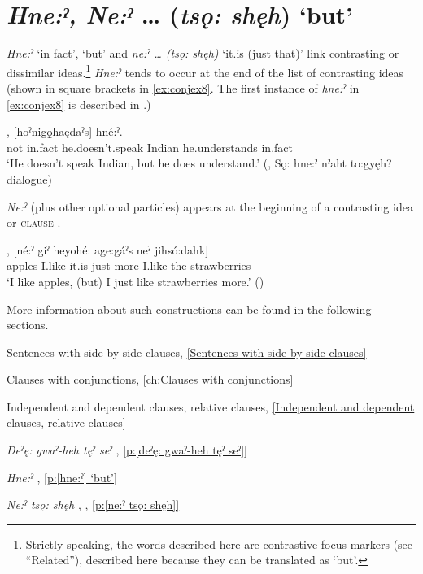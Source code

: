 \section{\textit{Hne:ˀ, Ne:ˀ} … (\textit{tsǫ: shęh}) ‘but’} \label{ch:[hne:ˀ], [ne:ˀ … (tsǫ: shęh)] ‘but’}
\textit{Hne:ˀ} ‘in fact’, ‘but’ and \textit{ne:ˀ … (tsǫ: shęh)} ‘it.is (just that)’ link contrasting or dissimilar ideas.\footnote{Strictly speaking, the words described here are contrastive focus markers (see “Related”), described here because they can be translated as ‘but’.} \textit{Hne:ˀ} tends to occur at the end of the list of contrasting ideas (shown in square brackets in \ref{ex:conjex8}. The first instance of \textit{hne:ˀ} in \ref{ex:conjex8} is described in .)

\ea\label{ex:conjex8}
, [hoˀnigǫ̱haędaˀs] hné:ˀ.\\
not in.fact he.doesn’t.speak Indian he.understands in.fact\\
\glt ‘He doesn’t speak Indian, but he does understand.’ (\cite[61]{mithun_watewayestanih_1984}, Sǫ: hne:ˀ nˀaht to:gyęh? dialogue)
\z

\textit{Ne:ˀ} (plus other optional particles) appears at the beginning of a contrasting idea or \textsc{clause} . 

\ea\label{ex:conjex13} 
, [né:ˀ giˀ heyohé: age:gáˀs neˀ jihsó:dahk]\\
apples I.like it.is just more I.like the strawberries\\
\glt ‘I like apples, (but) I just like strawberries more.’ (\cite[45]{michelson_ontario_2011})
\z

More information about such constructions can be found in the following sections.

\begin{CayugaRelated}
\item Sentences with side-by-side clauses, \ref{Sentences with side-by-side clauses}

\item Clauses with conjunctions, \ref{ch:Clauses with conjunctions}

\item Independent and dependent clauses, relative clauses, \ref{Independent and dependent clauses, relative clauses}

\item{} \textit{Deˀę: gwaˀ-heh tęˀ seˀ} , \ref{p:[deˀę: gwaˀ-heh tęˀ seˀ]}

\item{} \textit{Hne:ˀ} , \ref{p:[hne:ˀ] ‘but’}

\item{} \textit{Ne:ˀ tsǫ: shęh} , , \ref{p:[ne:ˀ tsǫ: shęh]}


\end{CayugaRelated}


